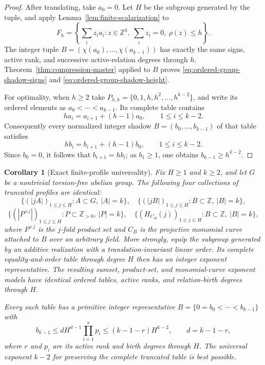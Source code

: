 \documentclass[11pt,reqno]{amsart}
\newtheorem{corollary}[theorem]{Corollary}
\theoremstyle{definition}
\theoremstyle{remark}
\begin{document}
\begin{proof}
After translating, take $a_0=0$.  Let $H$ be the subgroup generated by the
tuple, and apply Lemma~\ref{lem:finite-scalarization} to
\[
 F_h=\left\{\sum_i z_i a_i:
 z\in\mathbb Z^k,\ \sum_i z_i=0,\ \rho(z)\leq h\right\}.
\]
The integer tuple $B=(\chi(a_0),\ldots,\chi(a_{k-1}))$ has exactly the same
signs, active rank, and successive active-relation degrees through $h$.
Theorem~\ref{thm:compression-master} applied to $B$ proves
\eqref{eq:ordered-group-shadow-signs} and
\eqref{eq:ordered-group-shadow-height}.

For optimality, when $h\geq2$ take
$P_{h,k}=\{0,1,h,h^2,\ldots,h^{k-2}\}$, and write its ordered elements as
$a_0<\cdots<a_{k-1}$.  Its complete table contains
\[
 h a_i=a_{i+1}+(h-1)a_0,
 \qquad1\leq i\leq k-2.
\]
Consequently every normalized integer shadow
$B=(b_0,\ldots,b_{k-1})$ of that table satisfies
\[
 h b_i=b_{i+1}+(h-1)b_0,
 \qquad1\leq i\leq k-2.
\]
Since $b_0=0$, it follows that $b_{i+1}=hb_i$; as $b_1\geq1$, one obtains
$b_{k-1}\geq h^{k-2}$.
\end{proof}

\begin{corollary}[Exact finite-profile universality]
\label{cor:finite-profile-transfer}
Fix $H\geq1$ and $k\geq2$, and let $G$ be a nontrivial torsion-free abelian
group.  The following four collections of truncated profiles are identical:
\[
 \bigl\{(|jA|)_{1\leq j\leq H}:A\subset G,\ |A|=k\bigr\},
 \quad
 \bigl\{(|jB|)_{1\leq j\leq H}:B\subset\mathbb Z,\ |B|=k\bigr\},
\]
\[
 \bigl\{(|P^{\times j}|)_{1\leq j\leq H}:
       P\subset\mathbb Z_{>0},\ |P|=k\bigr\},
 \quad
 \bigl\{(H_{C_B}(j))_{1\leq j\leq H}:
       B\subset\mathbb Z,\ |B|=k\bigr\},
\]
where $P^{\times j}$ is the $j$-fold product set and $C_B$ is the projective
monomial curve attached to $B$ over an arbitrary field.  More strongly,
equip the subgroup generated by an additive realization with a
translation-invariant linear order.  Its complete equality-and-order table
through degree $H$ then has an integer exponent representative.  The
resulting sumset, product-set, and monomial-curve exponent models have
identical ordered tables, active ranks, and relation-birth degrees through
$H$.

Every such table has a primitive integer representative
$B=\{0=b_0<\cdots<b_{k-1}\}$ with
\begin{equation}\label{eq:finite-profile-universal-height}
 b_{k-1}\leq dH^{d-1}\prod_{i=1}^r p_i
 \leq(k-1-r)H^{k-2},
 \qquad d=k-1-r,
\end{equation}
where $r$ and $p_i$ are its active rank and birth degrees through $H$.
The universal exponent $k-2$ for preserving the complete truncated table is
best possible.
\end{corollary}
\end{document}
